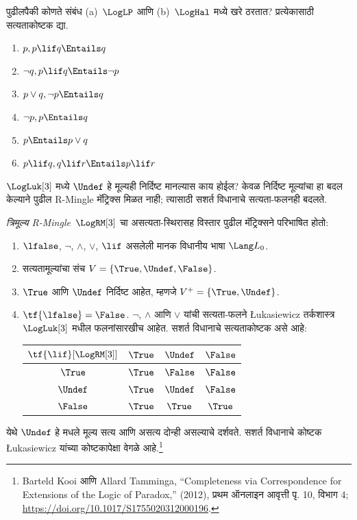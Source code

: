 \documentclass[../../../include/open-logic-section]{subfiles}
\begin{document}
\begin{prob}
  पुढीलपैकी कोणते संबंध (a)~$\LogLP$ आणि (b)~$\LogHal$
  मध्ये खरे ठरतात? प्रत्येकासाठी सत्यताकोष्टक द्या.
  \begin{enumerate}
    \item $p, p \lif q \Entails q$
    \item $\lnot q, p \lif q \Entails \lnot p$
    \item $p \lor q, \lnot p \Entails q$
    \item $\lnot p, p \Entails q$
    \item $p \Entails p \lor q$
    \item $p \lif q, q\lif r \Entails p \lif r$
  \end{enumerate}
\end{prob}

$\LogLuk[3]$ मध्ये $\Undef$ हे मूल्यही निर्दिष्ट मानल्यास
काय होईल?
केवळ निर्दिष्ट मूल्यांचा हा बदल केल्याने पुढील R-Mingle
मॅट्रिक्स मिळत नाही; त्यासाठी सशर्त विधानाचे सत्यता-फलनही बदलते.

\begin{defn}
  \emph{त्रिमूल्य R-Mingle}~$\LogRM[3]$ चा असत्यता-स्थिरासह
  विस्तार पुढील मॅट्रिक्सने परिभाषित होतो:
  \begin{enumerate}
    \item $\lfalse$, $\lnot$, $\land$, $\lor$, $\lif$ असलेली मानक विधानीय भाषा $\Lang L_0$.
    \item सत्यतामूल्यांचा संच $V = \{\True, \Undef, \False\}$.
    \item $\True$ आणि $\Undef$ निर्दिष्ट आहेत, म्हणजे $V^+ = \{\True, \Undef\}$.
    \item $\tf{\lfalse}=\False$. $\lnot$, $\land$ आणि $\lor$
    यांची सत्यता-फलने \L ukasiewicz तर्कशास्त्र~$\LogLuk[3]$
    मधील फलनांसारखीच आहेत. सशर्त विधानाचे सत्यताकोष्टक असे आहे:
    \begin{center}
      \begin{tabular}{c|ccc}
        $\tf{\lif}[\LogRM[3]]$ & $\True$ & $\Undef$ & $\False$ \\
        \hline
        $\True$ & $\True$ & $\False$ & $\False$ \\
        $\Undef$ & $\True$ & $\Undef$ & $\False$ \\
        $\False$ & $\True$ & $\True$ & $\True$
      \end{tabular}
    \end{center}
  \end{enumerate}
  येथे $\Undef$ हे मधले मूल्य सत्य आणि असत्य दोन्ही असल्याचे
  दर्शवते. सशर्त विधानाचे कोष्टक \L ukasiewicz यांच्या कोष्टकापेक्षा
  वेगळे आहे.\footnote{Barteld Kooi आणि Allard Tamminga,
  ``Completeness via Correspondence for Extensions of the Logic of
  Paradox,'' (2012), प्रथम ऑनलाइन आवृत्ती पृ. 10, विभाग 4;
  \url{https://doi.org/10.1017/S1755020312000196}.}
\end{defn}
\end{document}
